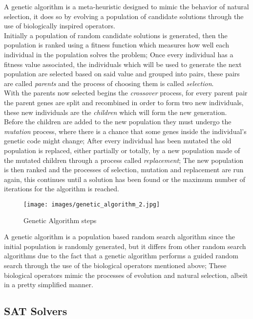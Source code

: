 A genetic algorithm is a meta-heuristic designed to mimic the behavior of natural selection, it does so by evolving a population of candidate solutions through the use of biologically inspired operators.
\\Initially a population of random candidate solutions is generated, then the population is ranked using a fitness function which measures how well each individual in the population solves the problem; Once every individual has a fitness value associated, the individuals which will be used to generate the next population are selected based on said value and grouped into pairs, these pairs are called \textit{parents} and the process of choosing them is called \textit{selection}.
\\With the parents now selected begins the \textit{crossover} process, for every parent pair the parent genes are split and recombined in order to form two new individuals, these new individuals are the \textit{children} which will form the new generation.
\\Before the children are added to the new population they must undergo the \textit{mutation} process, where there is a chance that some genes inside the individual's genetic code might change; After every individual has been mutated the old population is replaced, either partially or totally, by a new population made of the mutated children through a process called \textit{replacement}; The new population is then ranked and the processes of selection, mutation and replacement are run again, this continues until a solution has been found or the maximum number of iterations for the algorithm is reached. 

\begin{figure}[!ht]
	\centering
	\texttt{[image: images/genetic\_algorithm\_2.jpg]}
	\caption{Genetic Algorithm steps}
	\label{fig:Genetic_algorithm}
\end{figure}

A genetic algorithm is a population based random search algorithm \parencite{Cochran2011} since the initial population is randomly generated, but it differs from other random search algorithms due to the fact that a genetic algorithm performs a guided random search through the use of the biological operators mentioned above; These biological operators mimic the processes of evolution and natural selection, albeit in a pretty simplified manner. 


\subsection{SAT Solvers}
\label{subsection:sat_solvers}


